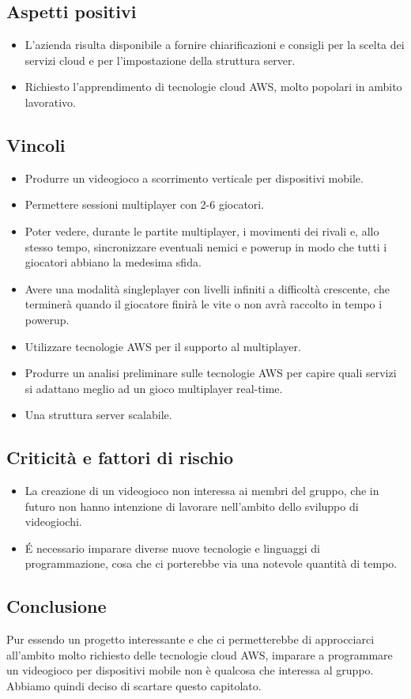 \subsection{Aspetti positivi}
\begin{itemize}
\item L'azienda risulta disponibile a fornire chiarificazioni e consigli per la scelta dei servizi cloud e per l'impostazione della struttura server.
\item Richiesto l'apprendimento di tecnologie cloud AWS, molto popolari in ambito lavorativo.
\end{itemize}

\subsection{Vincoli}
\begin{itemize}
\item Produrre un videogioco a scorrimento verticale per dispositivi mobile.
\item Permettere sessioni multiplayer con 2-6 giocatori.
\item Poter vedere, durante le partite multiplayer, i movimenti dei rivali e, allo stesso tempo, sincronizzare eventuali nemici e powerup in modo che tutti i giocatori abbiano la medesima sfida.
\item Avere una modalità singleplayer con livelli infiniti a difficoltà crescente, che terminerà quando il giocatore finirà le vite o non avrà raccolto in tempo i powerup.
\item Utilizzare tecnologie AWS per il supporto al multiplayer.
\item Produrre un analisi preliminare sulle tecnologie AWS per capire quali servizi si adattano meglio ad un gioco multiplayer real-time.
\item Una struttura server scalabile.
\end{itemize}

\subsection{Criticità e fattori di rischio}
\begin{itemize}
\item La creazione di un videogioco non interessa ai membri del gruppo, che in futuro non hanno intenzione di lavorare nell'ambito dello sviluppo di videogiochi.
\item É necessario imparare diverse nuove tecnologie e linguaggi di programmazione, cosa che ci porterebbe via una notevole quantità di tempo.
\end{itemize}

\subsection{Conclusione}
Pur essendo un progetto interessante e che ci permetterebbe di approcciarci all'ambito molto richiesto delle tecnologie cloud AWS, imparare a programmare un videogioco per dispositivi mobile non è qualcosa che interessa al gruppo. Abbiamo quindi deciso di scartare questo capitolato.